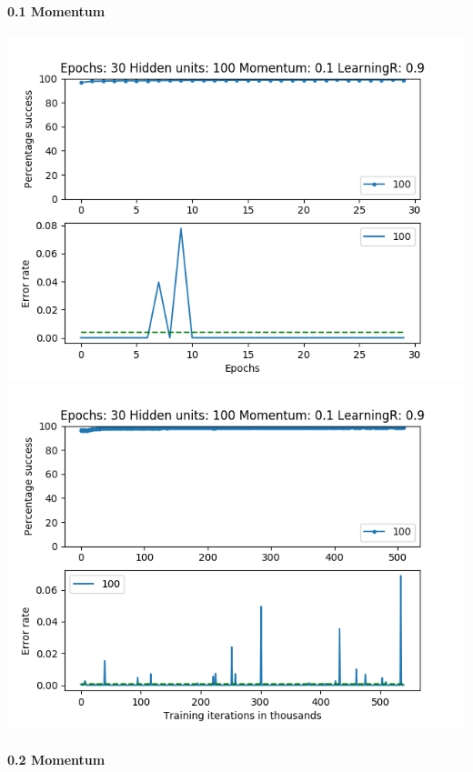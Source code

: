 \documentclass[11pt]{article}
\makeatletter
\def\maxwidth{\ifdim\Gin@nat@width>\linewidth\linewidth
    \else\Gin@nat@width\fi}
\let\Oldincludegraphics\includegraphics
\renewcommand{\includegraphics}[1]{\Oldincludegraphics[width=.8\maxwidth]{#1}}
\makeatother
\begin{document}
\hypertarget{momentum-1}{%
\paragraph{0.1 Momentum}\label{momentum-1}}

\includegraphics{Experiment1/E1_NN_Epoch_Momentum_0.1_30Epochs_100_LR_0.9_Hiddenunits.png}
\includegraphics{Experiment1/E1_NN_Training_Momentum_0.1_30Epochs_100_LR_0.9_Hiddenunits.png}

\hypertarget{momentum-2}{%
\paragraph{0.2 Momentum}\label{momentum-2}}
\end{document}
